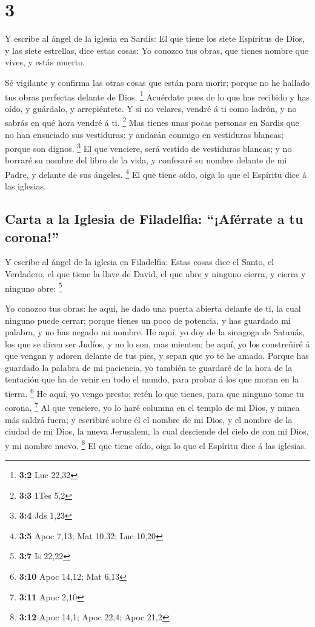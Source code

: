 \hypertarget{section-2}{%
\section{3}\label{section-2}}

 Y escribe al ángel de la iglesia en Sardis: El que tiene
los siete Espíritus de Dios, y las siete estrellas, dice estas cosas: Yo
conozco tus obras, que tienes nombre que vives, y estás muerto.

 Sé vigilante y confirma las otras cosas que están para
morir; porque no he hallado tus obras perfectas delante de Dios.
\footnote{\textbf{3:2} Luc 22,32}  Acuérdate pues de lo
que has recibido y has oído, y guárdalo, y arrepiéntete. Y si no
velares, vendré á ti como ladrón, y no sabrás en qué hora vendré á ti.
\footnote{\textbf{3:3} 1Tes 5,2}  Mas tienes unas pocas
personas en Sardis que no han ensuciado sus vestiduras: y andarán
conmigo en vestiduras blancas; porque son dignos. \footnote{\textbf{3:4}
  Jds 1,23}  El que venciere, será vestido de vestiduras
blancas; y no borraré su nombre del libro de la vida, y confesaré su
nombre delante de mi Padre, y delante de sus ángeles. \footnote{\textbf{3:5}
  Apoc 7,13; Mat 10,32; Luc 10,20}  El que tiene oído,
oiga lo que el Espíritu dice á las iglesias.

\hypertarget{carta-a-la-iglesia-de-filadelfia-afuxe9rrate-a-tu-corona}{%
\subsection{Carta a la Iglesia de Filadelfia: ``¡Aférrate a tu
corona!''}\label{carta-a-la-iglesia-de-filadelfia-afuxe9rrate-a-tu-corona}}

 Y escribe al ángel de la iglesia en Filadelfia: Estas
cosas dice el Santo, el Verdadero, el que tiene la llave de David, el
que abre y ninguno cierra, y cierra y ninguno abre: \footnote{\textbf{3:7}
  Is 22,22}

 Yo conozco tus obras: he aquí, he dado una puerta abierta
delante de ti, la cual ninguno puede cerrar; porque tienes un poco de
potencia, y has guardado mi palabra, y no has negado mi nombre.
 He aquí, yo doy de la sinagoga de Satanás, los que se
dicen ser Judíos, y no lo son, mas mienten; he aquí, yo los constreñiré
á que vengan y adoren delante de tus pies, y sepan que yo te he amado.
 Porque has guardado la palabra de mi paciencia, yo
también te guardaré de la hora de la tentación que ha de venir en todo
el mundo, para probar á los que moran en la tierra. \footnote{\textbf{3:10}
  Apoc 14,12; Mat 6,13}  He aquí, yo vengo presto; retén
lo que tienes, para que ninguno tome tu corona. \footnote{\textbf{3:11}
  Apoc 2,10}  Al que venciere, yo lo haré columna en el
templo de mi Dios, y nunca más saldrá fuera; y escribiré sobre él el
nombre de mi Dios, y el nombre de la ciudad de mi Dios, la nueva
Jerusalem, la cual desciende del cielo de con mi Dios, y mi nombre
nuevo. \footnote{\textbf{3:12} Apoc 14,1; Apoc 22,4; Apoc 21,2}
 El que tiene oído, oiga lo que el Espíritu dice á las
iglesias.

